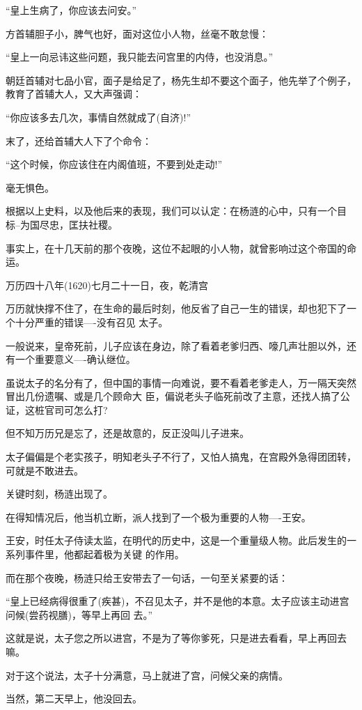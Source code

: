 \documentclass[11pt,a4paper,onecolumn]{article}
\begin{document}
``皇上生病了，你应该去问安。''

方首辅胆子小，脾气也好，面对这位小人物，丝毫不敢怠慢：

``皇上一向忌讳这些问题，我只能去问宫里的内侍，也没消息。''

朝廷首辅对七品小官，面子是给足了，杨先生却不要这个面子，他先举了个例子，教育了首辅大人，又大声强调：

``你应该多去几次，事情自然就成了(自济)!''

末了，还给首辅大人下了个命令：

``这个时候，你应该住在内阁值班，不要到处走动!''

毫无惧色。

根据以上史料，以及他后来的表现，我们可以认定：在杨涟的心中，只有一个目标--为国尽忠，匡扶社稷。

事实上，在十几天前的那个夜晚，这位不起眼的小人物，就曾影响过这个帝国的命运。

万历四十八年(1620)七月二十一日，夜，乾清宫

万历就快撑不住了，在生命的最后时刻，他反省了自己一生的错误，却也犯下了一个十分严重的错误----没有召见
太子。

一般说来，皇帝死前，儿子应该在身边，除了看着老爹归西、嚎几声壮胆以外，还有一个重要意义----确认继位。

虽说太子的名分有了，但中国的事情一向难说，要不看着老爹走人，万一隔天突然冒出几份遗嘱、或是几个顾命大
臣，偏说老头子临死前改了主意，还找人搞了公证，这桩官司可怎么打?

但不知万历兄是忘了，还是故意的，反正没叫儿子进来。

太子偏偏是个老实孩子，明知老头子不行了，又怕人搞鬼，在宫殿外急得团团转，可就是不敢进去。

关键时刻，杨涟出现了。

在得知情况后，他当机立断，派人找到了一个极为重要的人物----王安。

王安，时任太子侍读太监，在明代的历史中，这是一个重量级人物。此后发生的一系列事件里，他都起着极为关键
的作用。

而在那个夜晚，杨涟只给王安带去了一句话，一句至关紧要的话：

``皇上已经病得很重了(疾甚)，不召见太子，并不是他的本意。太子应该主动进宫问候(尝药视膳)，等早上再回
去。''

这就是说，太子您之所以进宫，不是为了等你爹死，只是进去看看，早上再回去嘛。

对于这个说法，太子十分满意，马上就进了宫，问候父亲的病情。

当然，第二天早上，他没回去。
\end{document}
